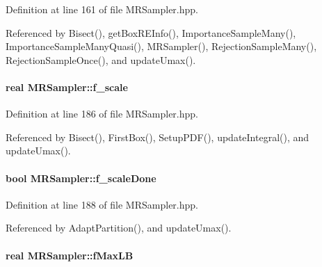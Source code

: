 \-Definition at line 161 of file \-M\-R\-Sampler.\-hpp.



\-Referenced by \-Bisect(), get\-Box\-R\-E\-Info(), \-Importance\-Sample\-Many(), \-Importance\-Sample\-Many\-Quasi(), \-M\-R\-Sampler(), \-Rejection\-Sample\-Many(), \-Rejection\-Sample\-Once(), and update\-Umax().

\hypertarget{classMRSampler_a9c85b485d8d4ed429e23af0e0427cbe8}{
\paragraph[{f\-\_\-scale}]{\setlength{\rightskip}{0pt plus 5cm}real {\bf \-M\-R\-Sampler\-::f\-\_\-scale}}}\label{classMRSampler_a9c85b485d8d4ed429e23af0e0427cbe8}


\-Definition at line 186 of file \-M\-R\-Sampler.\-hpp.



\-Referenced by \-Bisect(), \-First\-Box(), \-Setup\-P\-D\-F(), update\-Integral(), and update\-Umax().

\hypertarget{classMRSampler_aa677251ac24e0083e75a9ba5f4aa02ca}{
\paragraph[{f\-\_\-scale\-Done}]{\setlength{\rightskip}{0pt plus 5cm}bool {\bf \-M\-R\-Sampler\-::f\-\_\-scale\-Done}}}\label{classMRSampler_aa677251ac24e0083e75a9ba5f4aa02ca}


\-Definition at line 188 of file \-M\-R\-Sampler.\-hpp.



\-Referenced by \-Adapt\-Partition(), and update\-Umax().

\hypertarget{classMRSampler_a5980112acaced10adc29397c200fa798}{
\paragraph[{f\-Max\-L\-B}]{\setlength{\rightskip}{0pt plus 5cm}real {\bf \-M\-R\-Sampler\-::f\-Max\-L\-B}}}\label{classMRSampler_a5980112acaced10adc29397c200fa798}


